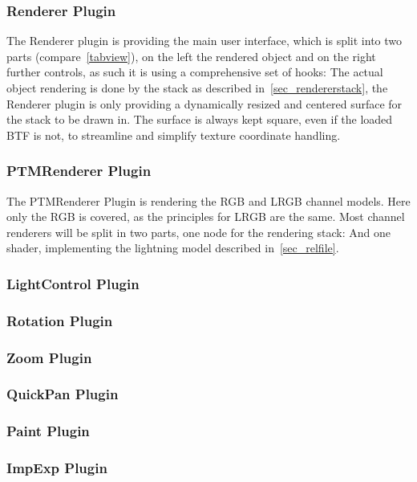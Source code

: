 \subsubsection{Renderer Plugin}
The Renderer plugin is providing the main user interface, which is split into
two parts (compare~\autoref{tabview}), on the left the rendered object and on
the right further controls, as such it is using a comprehensive set of hooks:
The actual object rendering is done by the stack as described
in~\autoref{sec_rendererstack}, the Renderer plugin is only providing a
dynamically resized and centered surface for the stack to be drawn in. The
surface is always kept square, even if the loaded BTF is not, to streamline and
simplify texture coordinate handling.

\subsubsection{PTMRenderer Plugin}
The PTMRenderer Plugin is rendering the RGB and LRGB channel
models. Here only the RGB is covered, as the principles for LRGB are the same.
Most channel renderers will be split in two parts, one node for the rendering
stack:
And one shader, implementing the lightning model described in~\autoref{sec_relfile}.

\subsubsection{LightControl Plugin}
\subsubsection{Rotation Plugin}
\subsubsection{Zoom Plugin}
\subsubsection{QuickPan Plugin}
\subsubsection{Paint Plugin}
\subsubsection{ImpExp Plugin }

